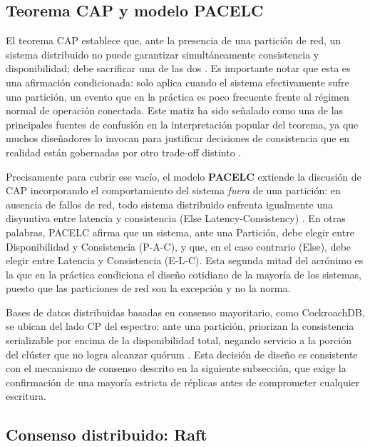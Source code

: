 \documentclass[12pt]{article}
\begin{document}
    \subsection{Teorema CAP y modelo PACELC}
    \label{sec:cap-pacelc}

    El teorema CAP establece que, ante la presencia de una partición de red, un sistema distribuido no puede garantizar simultáneamente consistencia y disponibilidad; debe sacrificar una de las dos \parencite{brewer2012cap}. Es importante notar que esta es una afirmación condicionada: solo aplica cuando el sistema efectivamente sufre una partición, un evento que en la práctica es poco frecuente frente al régimen normal de operación conectada. Este matiz ha sido señalado como una de las principales fuentes de confusión en la interpretación popular del teorema, ya que muchos diseñadores lo invocan para justificar decisiones de consistencia que en realidad están gobernadas por otro trade-off distinto \parencite{kleppmann2015critique}.

    Precisamente para cubrir ese vacío, el modelo \textbf{PACELC} extiende la discusión de CAP incorporando el comportamiento del sistema \emph{fuera} de una partición: en ausencia de fallos de red, todo sistema distribuido enfrenta igualmente una disyuntiva entre latencia y consistencia (Else Latency-Consistency) \parencite{abadi2012consistency}. En otras palabras, PACELC afirma que un sistema, ante una Partición, debe elegir entre Disponibilidad y Consistencia (P-A-C), y que, en el caso contrario (Else), debe elegir entre Latencia y Consistencia (E-L-C). Esta segunda mitad del acrónimo es la que en la práctica condiciona el diseño cotidiano de la mayoría de los sistemas, puesto que las particiones de red son la excepción y no la norma.

    Bases de datos distribuidas basadas en consenso mayoritario, como CockroachDB, se ubican del lado CP del espectro: ante una partición, priorizan la consistencia serializable por encima de la disponibilidad total, negando servicio a la porción del clúster que no logra alcanzar quórum \parencite{taft2020cockroachdb}. Esta decisión de diseño es consistente con el mecanismo de consenso descrito en la siguiente subsección, que exige la confirmación de una mayoría estricta de réplicas antes de comprometer cualquier escritura.

    \subsection{Consenso distribuido: Raft}
    \label{sec:raft}
\end{document}

